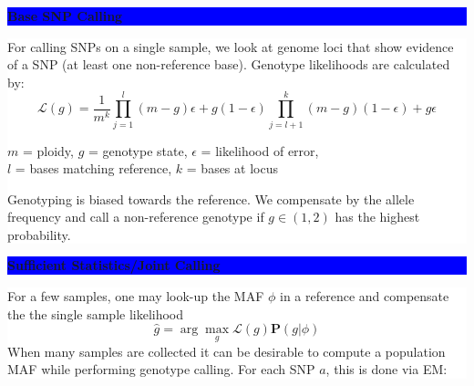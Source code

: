 \documentclass[11pt]{a0poster}
\begin{document}
{\begin{minipage}[t][2045pt][t]{\linewidth}
\begin{minipage}{0.6\linewidth}
\vspace{75pt}
\begin{minipage}{0.47\linewidth}
\colorbox{Blue}{
\begin{minipage}[t]{\linewidth}
\vspace{30pt}
\begin{center}
\Huge \bf \color{White} Base SNP Calling
\end{center}
\vspace{17pt}
\end{minipage}
}
\colorbox{White}{
\begin{minipage}[t][520pt][t]{\linewidth}
\color{Blue}
\vspace{20pt}
\LARGE For calling SNPs on a single sample, we look at genome loci that show evidence
of a SNP (at least one non-reference base). Genotype likelihoods are calculated
by:
\large$$\mathcal{L}(g)=\frac{1}{m^k}\prod_{j=1}^{l}{(m - g) \epsilon + g (1 - \epsilon)}\prod_{j=l + 1}^{k}{(m - g)(1 - \epsilon) + g \epsilon}$$
\begin{center}
\small $m$ = ploidy, $g$ = genotype state, $\epsilon$ = likelihood of error, \\
$l$ = bases matching reference, $k$ = bases at locus
\end{center}
\LARGE Genotyping is biased towards the reference. We compensate by the allele
frequency and call a non-reference genotype if $g \in (1, 2)$ has the highest probability.
\pagebreak
\end{minipage}
}
\end{minipage}
\begin{minipage}{0.06\linewidth}
\hfill
\pagebreak
\end{minipage}
\begin{minipage}{0.47\linewidth}
\colorbox{Blue}{
\begin{minipage}[t]{\linewidth}
\vspace{30pt}
\begin{center}
\Huge \bf \color{White} Sufficient Statistics/Joint Calling
\end{center}
\vspace{17pt}
\end{minipage}
}
\colorbox{White}{
\begin{minipage}[t][520pt][t]{\linewidth}
\color{Blue}
\vspace{20pt}
\LARGE For a few samples, one may look-up the MAF $\phi$ in a reference and compensate the
the single sample likelihood
\large $$\hat{g} = \arg\max_{g} \mathcal{L}(g)\mathbf{P}(g | \phi)$$ 
\LARGE When many samples are collected it can be desirable to compute a population MAF while
performing genotype calling. For each SNP $a$, this is done via EM:


\end{minipage}}
\end{minipage}
\end{minipage}
\end{minipage}}
\end{document}

